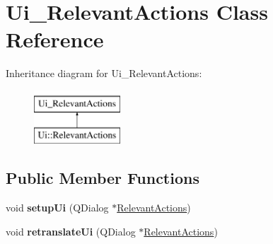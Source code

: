 \hypertarget{class_ui___relevant_actions}{\section{Ui\-\_\-\-Relevant\-Actions Class Reference}
\label{class_ui___relevant_actions}
}
Inheritance diagram for Ui\-\_\-\-Relevant\-Actions\-:\begin{figure}[H]
\begin{center}
\leavevmode
\includegraphics[height=2.000000cm]{class_ui___relevant_actions}
\end{center}
\end{figure}
\subsection*{Public Member Functions}
\begin{DoxyCompactItemize}
\item 
\hypertarget{class_ui___relevant_actions_a907939d3755d20415fbabf699be8e2a7}{void {\bfseries setup\-Ui} (Q\-Dialog $\ast$\hyperlink{class_relevant_actions}{Relevant\-Actions})}\label{class_ui___relevant_actions_a907939d3755d20415fbabf699be8e2a7}

\item 
\hypertarget{class_ui___relevant_actions_a4dd7b0aaf57d8fdd95f75bff07e322f7}{void {\bfseries retranslate\-Ui} (Q\-Dialog $\ast$\hyperlink{class_relevant_actions}{Relevant\-Actions})}\label{class_ui___relevant_actions_a4dd7b0aaf57d8fdd95f75bff07e322f7}

\end{DoxyCompactItemize}
